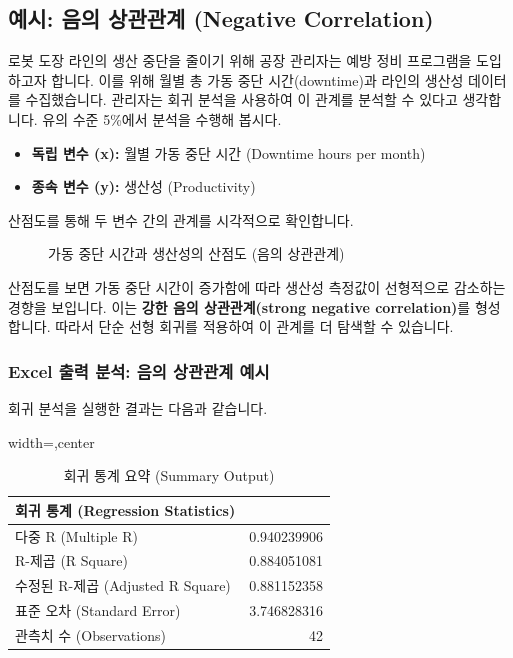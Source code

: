 \documentclass[11pt,a4paper]{book}
\theoremstyle{definition}
\begin{document}
\subsection{예시: 음의 상관관계 (Negative Correlation)}
로봇 도장 라인의 생산 중단을 줄이기 위해 공장 관리자는 예방 정비 프로그램을 도입하고자 합니다. 이를 위해 월별 총 가동 중단 시간(downtime)과 라인의 생산성 데이터를 수집했습니다. 관리자는 회귀 분석을 사용하여 이 관계를 분석할 수 있다고 생각합니다. 유의 수준 5\%에서 분석을 수행해 봅시다.

\begin{itemize}
    \item \textbf{독립 변수 (x):} 월별 가동 중단 시간 (Downtime hours per month)
    \item \textbf{종속 변수 (y):} 생산성 (Productivity)
\end{itemize}
산점도를 통해 두 변수 간의 관계를 시각적으로 확인합니다.

\begin{figure}[h!]
    \centering
    \caption{가동 중단 시간과 생산성의 산점도 (음의 상관관계)}
    \label{fig:negative_correlation_scatter}
\end{figure}
\begin{tcolorbox}[colback=lightblue,colframe=darkblue,title={산점도 분석: 음의 상관관계}]
산점도를 보면 가동 중단 시간이 증가함에 따라 생산성 측정값이 선형적으로 감소하는 경향을 보입니다. 이는 \textbf{강한 음의 상관관계(strong negative correlation)}를 형성합니다. 따라서 단순 선형 회귀를 적용하여 이 관계를 더 탐색할 수 있습니다.
\end{tcolorbox}

\subsubsection{Excel 출력 분석: 음의 상관관계 예시}
회귀 분석을 실행한 결과는 다음과 같습니다.

\begin{table}[h!]
    \centering
    \caption{회귀 통계 요약 (Summary Output)}
    \label{tab:regression_summary_output_negative}
    \begin{adjustbox}{width=\textwidth,center}
    \begin{tabular}{lr}
    \toprule
    \textbf{회귀 통계 (Regression Statistics)} & \\
    \midrule
    다중 R (Multiple R) & 0.940239906 \\
    R-제곱 (R Square) & 0.884051081 \\
    수정된 R-제곱 (Adjusted R Square) & 0.881152358 \\
    표준 오차 (Standard Error) & 3.746828316 \\
    관측치 수 (Observations) & 42 \\
    \bottomrule
    \end{tabular}
    \end{adjustbox}
\end{table}
\end{document}
